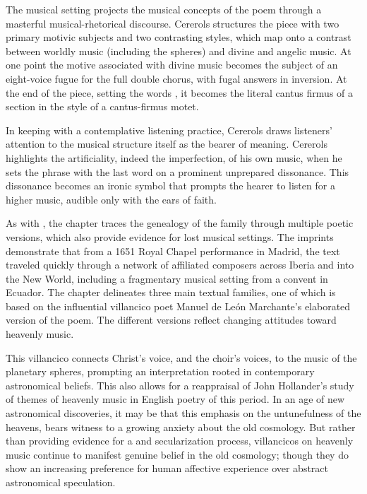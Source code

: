 \documentclass{vcbook-proposal}
\begin{document}
The musical setting projects the musical concepts of the poem through a 
masterful musical-rhetorical discourse.
Cererols structures the piece with two primary motivic subjects and two 
contrasting styles, which map onto a contrast between worldly music (including 
the spheres) and divine and angelic music. 
At one point the motive associated with divine music becomes the subject of an 
eight-voice fugue for the full double chorus, with fugal answers in inversion.
At the end of the piece, setting the words , it becomes the literal cantus firmus of a section in the style of a 
cantus-firmus motet.

In keeping with a contemplative listening practice, Cererols draws listeners'
attention to the musical structure itself as the bearer of meaning.
Cererols highlights the artificiality, indeed the imperfection, of his own 
music, when he sets the phrase  with 
the last word on a prominent unprepared dissonance.
This dissonance becomes an ironic symbol that prompts the hearer to listen for 
a higher music, audible only with the ears of faith.

As with , the chapter traces the genealogy of the
 family through multiple poetic versions, which
also provide evidence for lost musical settings.
The imprints demonstrate that from a 1651 Royal Chapel performance in Madrid, 
the text traveled quickly through a network of affiliated composers across 
Iberia and into the New World, including a fragmentary musical setting from a 
convent in Ecuador.
The chapter delineates three main textual families, one of which is based on 
the influential villancico poet Manuel de León Marchante's elaborated version 
of the poem. 
The different versions reflect changing attitudes toward heavenly music.

This villancico connects Christ's voice, and the choir's voices, to the music 
of the planetary spheres, prompting an interpretation rooted in contemporary 
astronomical beliefs.
This also allows for a reappraisal of John Hollander's study of themes of
heavenly music in English poetry of this period.%
  \Autocite{Hollander:Untuning}
In an age of new astronomical discoveries, it may be that this emphasis on the 
untunefulness of the heavens, bears witness to a growing anxiety about the old 
cosmology.
But rather than providing evidence for a  and secularization
process, villancicos on heavenly music continue to manifest genuine belief in
the old cosmology; though they do show an increasing preference for human affective
experience over abstract astronomical speculation.
\end{document}

